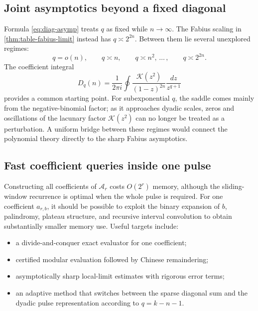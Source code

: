 \documentclass[11pt]{article}
\theoremstyle{definition}
\theoremstyle{remark}
\newcommand{\K}{\mathcal K}
\newcommand{\A}{\mathcal A}
\newcommand{\Diag}{D}
\begin{document}
\subsection{Joint asymptotics beyond a fixed diagonal}

Formula \cref{eq:diag-asymp} treats \(q\) as fixed while \(n\to\infty\).
The Fabius scaling in \cref{thm:table-fabius-limit} instead has
\(q\asymp2^{2n}\).  Between them lie several unexplored regimes:
\begin{equation}
 q=o(n),\qquad q\asymp n,\qquad q\asymp n^2,
 \,\ldots\,,\qquad q\asymp2^{2n}.                         \label{eq:scaling-regimes}
\end{equation}
The coefficient integral
\begin{equation}
 \Diag_q(n)=\frac{1}{2\pi i}\oint
  \frac{\K(z^2)}{(1-z)^{2n}}\frac{dz}{z^{q+1}}           \label{eq:diag-Cauchy}
\end{equation}
provides a common starting point.  For subexponential \(q\), the saddle
comes mainly from the negative-binomial factor; as it approaches dyadic
scales, zeros and oscillations of the lacunary factor \(\K(z^2)\) can no
longer be treated as a perturbation.  A uniform bridge between these
regimes would connect the polynomial theory directly to the sharp Fabius
asymptotics.

\subsection{Fast coefficient queries inside one pulse}

Constructing all coefficients of \(\A_r\) costs \(O(2^r)\) memory, although
the sliding-window recurrence is optimal when the whole pulse is required.
For one coefficient \(a_{r,b}\), it should be possible to exploit the
binary expansion of \(b\), palindromy, plateau structure, and recursive
interval convolution to obtain substantially smaller memory use.  Useful
targets include:
\begin{itemize}[leftmargin=2em]
\item a divide-and-conquer exact evaluator for one coefficient;
\item certified modular evaluation followed by Chinese remaindering;
\item asymptotically sharp local-limit estimates with rigorous error terms;
\item an adaptive method that switches between the sparse diagonal sum and
the dyadic pulse representation according to \(q=k-n-1\).
\end{itemize}
\end{document}
